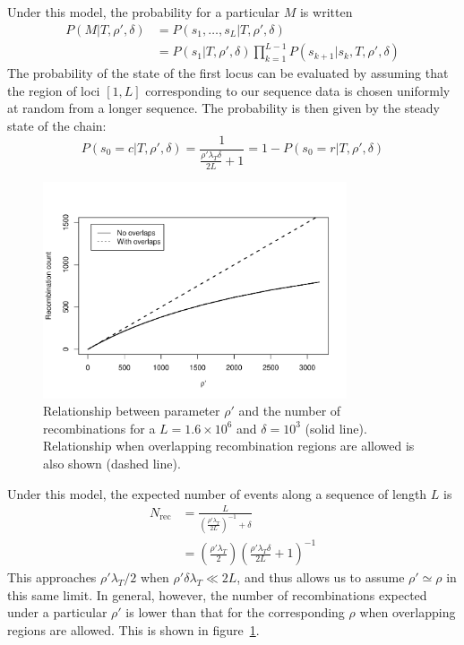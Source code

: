 \documentclass[a4paper,10pt]{article}
\begin{document}
Under this model, the probability for a particular $M$ is written
\begin{align}
  P(M|T,\rho',\delta)&=P(s_1,\ldots,s_L|T,\rho',\delta)\nonumber\\
  &=P(s_1|T,\rho',\delta)\prod_{k=1}^{L-1}P(s_{k+1}|s_k,T,\rho',\delta)
\end{align}
The probability of the state of the first locus can be evaluated by
assuming that the region of loci $[1,L]$ corresponding to our sequence
data is chosen uniformly at random from a longer sequence.  The
probability is then given by the steady state of the chain:
\begin{equation}
P(s_0=c|T,\rho',\delta)=\frac{1}{\frac{\rho'\lambda_T\delta}{2L}+1}=1-P(s_0=r|T,\rho',\delta)
\end{equation}

\begin{figure}[t]
\centering
\includegraphics[width=0.8\textwidth]{regionCount.pdf}
\caption{Relationship between parameter $\rho'$ and the number of
recombinations for a $L=1.6\times 10^6$ and $\delta=10^3$ (solid
line).  Relationship when overlapping recombination regions are
allowed is also shown (dashed line).}
\label{fig:recombCount}
\end{figure}

Under this model, the expected number of events along a sequence of
length $L$ is
\begin{align}
N_{\mathrm{rec}}&=\frac{L}{\left(\frac{\rho'\lambda_T}{2L}\right)^{-1}
  + \delta}\nonumber\\
&=\left(\frac{\rho'\lambda_T}{2}\right)\left(\frac{\rho'\lambda_T\delta}{2L}
  + 1\right)^{-1}
\end{align}
This approaches $\rho'\lambda_T/2$ when $\rho'\delta\lambda_T\ll 2L$,
and thus allows us to assume $\rho'\simeq\rho$ in this same limit. In
general, however, the number of recombinations expected under a
particular $\rho'$ is lower than that for the corresponding $\rho$
when overlapping regions are allowed.  This is shown in
figure~\ref{fig:recombCount}.
\end{document}
